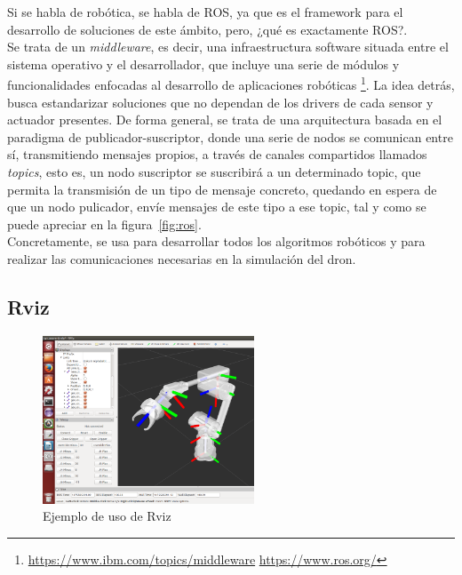 Si se habla de robótica, se habla de \ac{ROS}, ya que es el framework para el desarrollo de soluciones de este ámbito, pero, ¿qué es exactamente \ac{ROS}?.\\

Se trata de un \emph{middleware}, es decir, una infraestructura software situada entre el sistema operativo y el desarrollador, que incluye una serie de módulos y funcionalidades enfocadas al desarrollo de aplicaciones robóticas \footnote[6]{\url{https://www.ibm.com/topics/middleware} \url{https://www.ros.org/}}. La idea detrás, busca estandarizar soluciones que no dependan de los drivers de cada sensor y actuador presentes. De forma general, se trata de una arquitectura basada en el paradigma de publicador-suscriptor, donde una serie de nodos se comunican entre sí, transmitiendo mensajes propios, a través de canales compartidos llamados \emph{topics}, esto es, un nodo suscriptor se suscribirá a un determinado topic, que permita la transmisión de un tipo de mensaje concreto, quedando en espera de que un nodo pulicador, envíe mensajes de este tipo a ese topic, tal y como se puede apreciar en la figura~\ref{fig:ros}.\\

Concretamente, se usa para desarrollar todos los algoritmos robóticos y para realizar las comunicaciones necesarias en la simulación del dron.\\

\subsection{Rviz}
\label{subsec:rviz}

\begin{figure} [tp]
	\begin{center}
	\includegraphics[height=5cm]{imagenes/cap3/3_rviz_example.png}
	\end{center}
	\caption[Ejemplo de uso de Rviz]{Ejemplo de uso de Rviz}
	\label{fig:rviz}
\end{figure}


